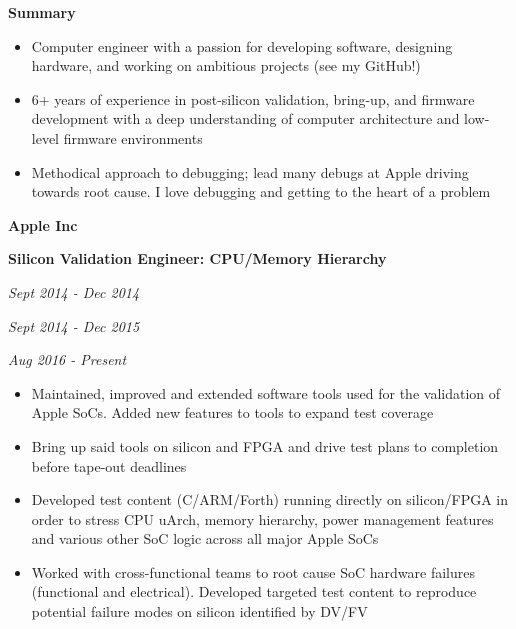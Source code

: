 \documentclass{article}
\newenvironment{name}{\fontfamily{phv}\selectfont\bfseries\normalsize}{\par}
\newenvironment{colorheading}{\fontfamily{phv}\selectfont\bfseries\normalsize\color{darkcyan}}{\par}
\newenvironment{metadata}{\fontfamily{phv}\selectfont\itshape\small\color{darkgray}}{\par}
\newenvironment{itemizedbody}{\fontfamily{phv}\selectfont\small\raggedright\begin{itemize}}{\end{itemize}\par}
\newenvironment{experience}[2]%
{%
  \begin{minipage}{0.71\linewidth}\raggedright#1\end{minipage}%
  \hfill%
  \begin{minipage}{0.28\linewidth}\raggedleft#2\end{minipage}%
}%
{\par}
\newcommand{\lineitem}{\item[{$\star$}]}
\newcommand{\dotsep}{\smallskip\begin{centering}\begin{colorheading}{\large$\bullet$}\end{colorheading}\end{centering}\smallskip}
\begin{document}
  \hfill
  \begin{minipage}[t]{0.67\linewidth}
    \begin{experience}
    {
      \begin{name}Summary\end{name}
    }{}
    \end{experience}
    \begin{itemizedbody}
      \lineitem Computer engineer with a passion for developing software, designing hardware, and working on ambitious projects
                (see my GitHub!)
      \lineitem 6+ years of experience in post-silicon validation, bring-up, and firmware development with a deep understanding
                of computer architecture and low-level firmware environments
      \lineitem Methodical approach to debugging; lead many debugs at Apple driving towards root cause. I love debugging and
                getting to the heart of a problem
    \end{itemizedbody}
    \dotsep
    \begin{experience}
    {
      \begin{name}Apple Inc\end{name}
      \begin{colorheading}Silicon Validation Engineer: CPU/Memory Hierarchy\end{colorheading}
    }
    {
      \begin{metadata}Sept 2014 - Dec 2014\end{metadata}
      \begin{metadata}Sept 2014 - Dec 2015\end{metadata}
      \begin{metadata}Aug 2016 - Present\end{metadata}
    }
    \end{experience}
    \begin{itemizedbody}
      \lineitem Maintained, improved and extended software tools used for the validation of Apple SoCs. Added new features to tools to expand test coverage
      \lineitem Bring up said tools on silicon and FPGA and drive test plans to completion before tape-out deadlines
      \lineitem Developed test content (C/ARM/Forth) running directly on silicon/FPGA in order to stress CPU uArch, memory
                hierarchy, power management features and various other SoC logic across all major Apple SoCs
      \lineitem Worked with cross-functional teams to root cause SoC hardware failures (functional and electrical). Developed
                targeted test content to reproduce potential failure modes on silicon identified by DV/FV

\end{itemizedbody}
\end{minipage}
\end{document}
